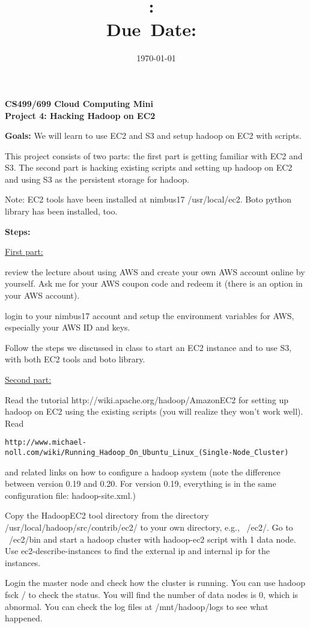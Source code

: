\documentclass{article}
\title{\textbf{\hmwkClass:\ 
      \hmwkTitle}\\\normalsize\small{Due\ Date:\
    \hmwkDueDate}}
\date{\today}
\author{\textbf{\hmwkAuthorName}}
\begin{document}
\begin{center}
\textbf{CS499/699 Cloud Computing Mini \\
Project 4: Hacking Hadoop on EC2}
\end{center}

\textbf{Goals:} We will learn to use EC2 and S3 and setup hadoop on EC2 with
scripts. 
 
This project consists of two parts: the first part is getting familiar
with EC2 and S3. The second part is hacking existing scripts and
setting up hadoop on EC2 and using S3 as the persistent storage for
hadoop.
 
Note: EC2 tools have been installed at nimbus17 /usr/local/ec2. Boto
python library has been installed, too.
 
\textbf{Steps:}

\underline{First part:}
 
review the lecture about using AWS and create your own AWS account
online by yourself. Ask me for your AWS coupon code and redeem it
(there is an option in your AWS account).
 
login to your nimbus17 account and setup the environment variables for
AWS, especially your AWS ID and keys.
 
Follow the steps we discussed in class to start an EC2 instance and to
use S3, with both EC2 tools and boto library.

\underline{Second part:}
 
Read the tutorial http://wiki.apache.org/hadoop/AmazonEC2 for setting
up hadoop on EC2 using the existing scripts (you will realize they
won’t work well). Read 
\begin{verbatim}
http://www.michael-noll.com/wiki/Running_Hadoop_On_Ubuntu_Linux_(Single-Node_Cluster)  
\end{verbatim}
and related links on how to configure a hadoop system (note the
difference between version 0.19 and 0.20. For version 0.19, everything
is in the same configuration file: hadoop-site.xml.)
 
Copy the HadoopEC2 tool directory from the directory
/usr/local/hadoop/src/contrib/ec2/ to your own directory, e.g.,
~/ec2/. Go to ~/ec2/bin and start a hadoop cluster with hadoop-ec2
script with 1 data node. Use ec2-describe-instances to find the
external ip and internal ip for the instances.
 
Login the master node and check how the cluster is running. You can
use hadoop fsck / to check the status. You will find the number of
data nodes is 0, which is abnormal. You can check the log files at
/mnt/hadoop/logs to see what happened.
 
\end{document}
